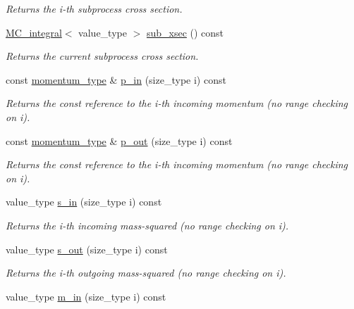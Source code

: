 \begin{DoxyCompactItemize}
\begin{DoxyCompactList}\small\item\em Returns the i-\/th subprocess cross section. \end{DoxyCompactList}\item 
\hypertarget{a00210_a11b1d4533738f78407dcddf13dee14b2}{\hyperlink{a00363}{M\-C\-\_\-integral}$<$ value\-\_\-type $>$ \hyperlink{a00210_a11b1d4533738f78407dcddf13dee14b2}{sub\-\_\-xsec} () const }\label{a00210_a11b1d4533738f78407dcddf13dee14b2}

\begin{DoxyCompactList}\small\item\em Returns the current subprocess cross section. \end{DoxyCompactList}\item 
const \hyperlink{a00559}{momentum\-\_\-type} \& \hyperlink{a00210_a4c3a6383c0445188ee515615b536f41d}{p\-\_\-in} (size\-\_\-type i) const 
\begin{DoxyCompactList}\small\item\em Returns the const reference to the i-\/th incoming momentum (no range checking on i). \end{DoxyCompactList}\item 
const \hyperlink{a00559}{momentum\-\_\-type} \& \hyperlink{a00210_affd056f9744793eef4d9cefec5d3ffb5}{p\-\_\-out} (size\-\_\-type i) const 
\begin{DoxyCompactList}\small\item\em Returns the const reference to the i-\/th incoming momentum (no range checking on i). \end{DoxyCompactList}\item 
\hypertarget{a00210_a6ae7fa6415e21a7cffc3dfc4dcbabeeb}{value\-\_\-type \hyperlink{a00210_a6ae7fa6415e21a7cffc3dfc4dcbabeeb}{s\-\_\-in} (size\-\_\-type i) const }\label{a00210_a6ae7fa6415e21a7cffc3dfc4dcbabeeb}

\begin{DoxyCompactList}\small\item\em Returns the i-\/th incoming mass-\/squared (no range checking on i). \end{DoxyCompactList}\item 
\hypertarget{a00210_a856af7863609bb4d14dafe1ee7024ce0}{value\-\_\-type \hyperlink{a00210_a856af7863609bb4d14dafe1ee7024ce0}{s\-\_\-out} (size\-\_\-type i) const }\label{a00210_a856af7863609bb4d14dafe1ee7024ce0}

\begin{DoxyCompactList}\small\item\em Returns the i-\/th outgoing mass-\/squared (no range checking on i). \end{DoxyCompactList}\item 
\hypertarget{a00210_aa09103ecc4bbb6bd92ce3f7c383c21ee}{value\-\_\-type \hyperlink{a00210_aa09103ecc4bbb6bd92ce3f7c383c21ee}{m\-\_\-in} (size\-\_\-type i) const }\label{a00210_aa09103ecc4bbb6bd92ce3f7c383c21ee}


\end{DoxyCompactItemize}
